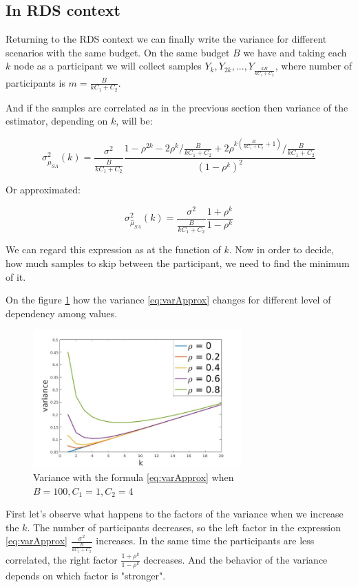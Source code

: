\documentclass[12pt]{report}
\begin{document}
\subsection{In RDS context}

Returning to the RDS context we can finally write the variance for different scenarios with the same budget. On the same budget $B$ we have and taking each $k$ node as a participant we will collect samples $Y_k, Y_{2k}, ..., Y_{\frac{kB}{kC_1 + C_2}}$, where number of participants is $m = \frac{B}{kC_1 + C_2}$. 
 
And if the samples are correlated as in the precvious section then variance of the estimator, depending on $k$, will be:

$$ \sigma^2_{\hat{\mu}_{SA}} (k) = \frac{\sigma^2}{\frac{B}{kC_1 + C_2}}\frac{1-\rho^{2k} - 2\rho^k/\frac{B}{kC_1 + C_2} + 2\rho^{k(\frac{B}{kC_1 + C_2}+1)}/\frac{B}{kC_1 + C_2}}{(1-\rho^k)^2}$$

Or approximated:

\begin{equation}
\label{eq:varApprox}
 \sigma^2_{\hat{\mu}_{SA}} (k) = \frac{\sigma^2}{\frac{B}{kC_1 + C_2}} \frac{1+\rho^k}{1-\rho^k}
\end{equation}

We can regard this expression as at the function of $k$. Now in order to decide, how much samples to skip between the participant, we need to find the minimum of it.


On the figure \ref{fig:varPredDifRho} how the variance \ref{eq:varApprox} changes for different level of dependency among values.


\begin{figure}[ht]
    \centering
    \includegraphics[height=200px]{varPredDifRho}
    \caption{Variance with the formula \ref{eq:varApprox} when $B = 100, C_1 = 1, C_2 = 4$}
    \label{fig:varPredDifRho}
\end{figure}

First let's observe what happens to the factors of the variance when we increase the $k$. The number of participants decreases, so the left factor in the expression \ref{eq:varApprox} $\frac{\sigma^2}{\frac{B}{kC_1 + C_2}}$ increases. In the same time the participants are less correlated, the right factor  $\frac{1+\rho^k}{1-\rho^k}$ decreases. And the behavior of the variance depends on which factor is "stronger".
\end{document}
